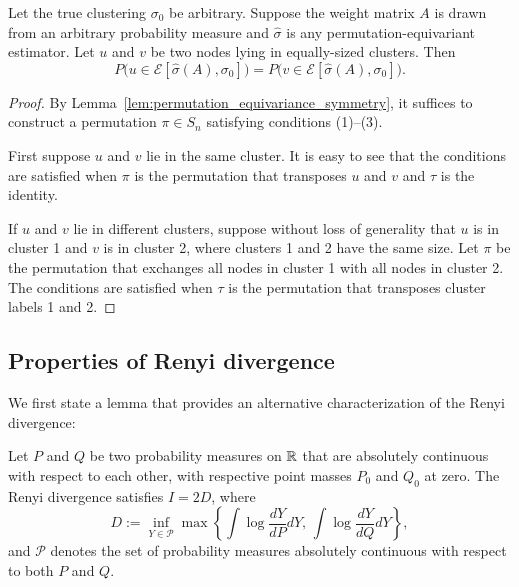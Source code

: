\documentclass{article}
\begin{document}
\begin{corollary}
\label{cor:permutation_equivariance_symmetry_sbm}
Let the true clustering $\sigma_0$ be arbitrary. Suppose the weight matrix $A$ is drawn from an arbitrary probability measure and $\hat{\sigma}$ is any permutation-equivariant estimator.  Let $u$ and $v$ be two nodes lying in equally-sized clusters. Then
\[
P\Big( u \in \mathcal{E}[\hat{\sigma}(A), \sigma_0]\Big) = P\Big( v \in \mathcal{E}[\hat{\sigma}(A), \sigma_0] \Big).
\]
\end{corollary}

\begin{proof}
By Lemma~\ref{lem:permutation_equivariance_symmetry}, it suffices to construct a permutation $\pi \in S_n$ satisfying conditions (1)--(3).

First suppose $u$ and $v$ lie in the same cluster. It is easy to see that the conditions are satisfied when $\pi$ is the permutation that transposes $u$ and $v$ and $\tau$ is the identity.

If $u$ and $v$ lie in different clusters, suppose without loss of generality that $u$ is in cluster 1 and $v$ is in cluster 2, where clusters 1 and 2 have the same size. Let $\pi$ be the permutation that exchanges all nodes in cluster 1 with all nodes in cluster 2. The conditions are satisfied when $\tau$ is the permutation that transposes cluster labels 1 and 2. 
\end{proof}

\subsection{Properties of Renyi divergence}

We first state a lemma that provides an alternative characterization of the Renyi divergence: 

\begin{lemma}
\label{lem:information_equivalence}
Let $P$ and $Q$ be two probability measures on ${\mathbb R}$ that are absolutely continuous with respect to each other, with respective point masses $P_0$ and $Q_0$ at zero. The Renyi divergence satisfies $I = 2D$, where
\begin{equation*}
D := \inf_{Y \in \mathcal{P}} \max \left\{ \int \log \frac{dY}{dP} dY, \, \int \log \frac{dY}{dQ} dY \right\},
\end{equation*}
and $\mathcal{P}$ denotes the set of probability measures absolutely continuous with respect to both $P$ and $Q$.
\end{lemma}
\end{document}

